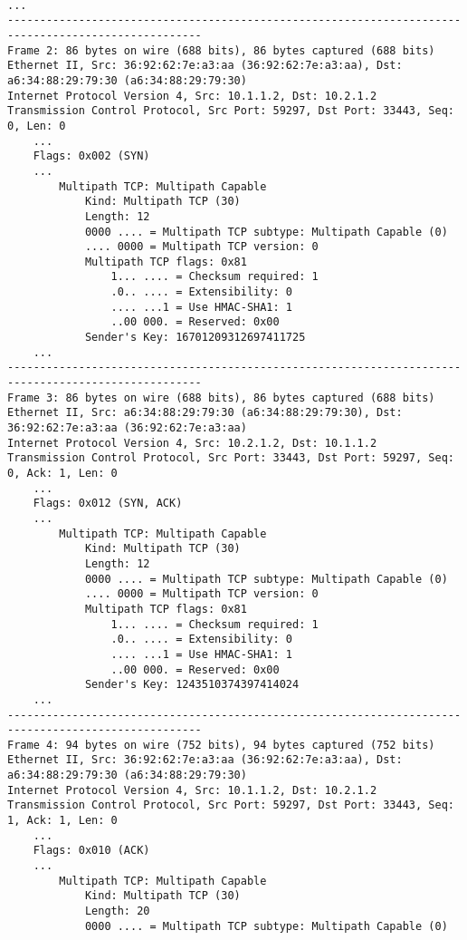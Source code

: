 \begingroup
    \fontsize{8pt}{9pt}\selectfont
	\begin{verbatim}

...
----------------------------------------------------------------------------------------------------
Frame 2: 86 bytes on wire (688 bits), 86 bytes captured (688 bits)
Ethernet II, Src: 36:92:62:7e:a3:aa (36:92:62:7e:a3:aa), Dst: a6:34:88:29:79:30 (a6:34:88:29:79:30)
Internet Protocol Version 4, Src: 10.1.1.2, Dst: 10.2.1.2
Transmission Control Protocol, Src Port: 59297, Dst Port: 33443, Seq: 0, Len: 0
    ...
    Flags: 0x002 (SYN)
    ...
        Multipath TCP: Multipath Capable
            Kind: Multipath TCP (30)
            Length: 12
            0000 .... = Multipath TCP subtype: Multipath Capable (0)
            .... 0000 = Multipath TCP version: 0
            Multipath TCP flags: 0x81
                1... .... = Checksum required: 1
                .0.. .... = Extensibility: 0
                .... ...1 = Use HMAC-SHA1: 1
                ..00 000. = Reserved: 0x00
            Sender's Key: 16701209312697411725
    ...
----------------------------------------------------------------------------------------------------
Frame 3: 86 bytes on wire (688 bits), 86 bytes captured (688 bits)
Ethernet II, Src: a6:34:88:29:79:30 (a6:34:88:29:79:30), Dst: 36:92:62:7e:a3:aa (36:92:62:7e:a3:aa)
Internet Protocol Version 4, Src: 10.2.1.2, Dst: 10.1.1.2
Transmission Control Protocol, Src Port: 33443, Dst Port: 59297, Seq: 0, Ack: 1, Len: 0
    ...
    Flags: 0x012 (SYN, ACK)
    ...
        Multipath TCP: Multipath Capable
            Kind: Multipath TCP (30)
            Length: 12
            0000 .... = Multipath TCP subtype: Multipath Capable (0)
            .... 0000 = Multipath TCP version: 0
            Multipath TCP flags: 0x81
                1... .... = Checksum required: 1
                .0.. .... = Extensibility: 0
                .... ...1 = Use HMAC-SHA1: 1
                ..00 000. = Reserved: 0x00
            Sender's Key: 1243510374397414024
    ...
----------------------------------------------------------------------------------------------------
Frame 4: 94 bytes on wire (752 bits), 94 bytes captured (752 bits)
Ethernet II, Src: 36:92:62:7e:a3:aa (36:92:62:7e:a3:aa), Dst: a6:34:88:29:79:30 (a6:34:88:29:79:30)
Internet Protocol Version 4, Src: 10.1.1.2, Dst: 10.2.1.2
Transmission Control Protocol, Src Port: 59297, Dst Port: 33443, Seq: 1, Ack: 1, Len: 0
    ...
    Flags: 0x010 (ACK)
    ...
        Multipath TCP: Multipath Capable
            Kind: Multipath TCP (30)
            Length: 20
            0000 .... = Multipath TCP subtype: Multipath Capable (0)

\end{verbatim}
